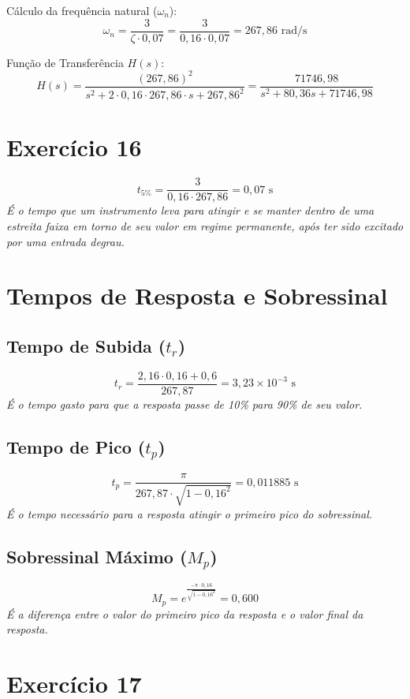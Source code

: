 Cálculo da frequência natural ($\omega_n$):
\[
\omega_n = \frac{3}{\zeta \cdot 0{,}07} = \frac{3}{0{,}16 \cdot 0{,}07} = 267{,}86 \text{ rad/s}
\]

Função de Transferência $H(s)$:
\[
H(s) = \frac{(267{,}86)^2}{s^2 + 2 \cdot 0{,}16 \cdot 267{,}86 \cdot s + 267{,}86^2} = \frac{71746{,}98}{s^2 + 80{,}36 s + 71746{,}98}
\]

\section*{Exercício 16}

\[
t_{5\%} = \frac{3}{0{,}16 \cdot 267{,}86} = 0{,}07\text{ s}
\]
\textit{É o tempo que um instrumento leva para atingir e se manter dentro de uma estreita faixa em torno de seu valor em regime permanente, após ter sido excitado por uma entrada degrau.}

\section*{Tempos de Resposta e Sobressinal}

\subsection*{Tempo de Subida ($t_r$)}
\[
t_r = \frac{2{,}16 \cdot 0{,}16 + 0{,}6}{267{,}87} = 3{,}23 \times 10^{-3} \text{ s}
\]
\textit{É o tempo gasto para que a resposta passe de 10\% para 90\% de seu valor.}

\subsection*{Tempo de Pico ($t_p$)}
\[
t_p = \frac{\pi}{267{,}87 \cdot \sqrt{1 - 0{,}16^2}} = 0{,}011885\text{ s}
\]
\textit{É o tempo necessário para a resposta atingir o primeiro pico do sobressinal.}

\subsection*{Sobressinal Máximo ($M_p$)}
\[
M_p = e^{\frac{-\pi \cdot 0{,}16}{\sqrt{1 - 0{,}16^2}}} = 0{,}600
\]
\textit{É a diferença entre o valor do primeiro pico da resposta e o valor final da resposta.}

\section*{Exercício 17}

